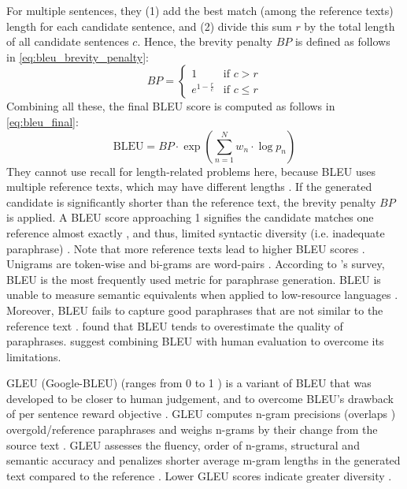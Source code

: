 For multiple sentences, they (1) add the best match (among the reference texts) length for each candidate sentence, and (2) divide this sum $r$ by the total length of all candidate sentences $c$. 
Hence, the brevity penalty $BP$ is defined as follows in \autoref{eq:bleu_brevity_penalty}:
\begin{equation}
    BP = \begin{cases}
        1 & \text{if } c > r \\
        e^{1 - \frac{r}{c}} & \text{if } c \leq r
    \end{cases}
\label{eq:bleu_brevity_penalty}
\end{equation}
Combining all these, the final BLEU score is computed as follows in \autoref{eq:bleu_final}:
\begin{equation}
    \text{BLEU} = BP \cdot \exp\left(\sum_{n=1}^{N} w_n \cdot \log p_n\right)
\label{eq:bleu_final}
\end{equation}
They cannot use recall for length-related problems here, because BLEU uses multiple reference texts, which may have different lengths \citep{papineni_bleu_2001,banerjee_METEOR_2005}.
If the generated candidate is significantly shorter than the reference text, the brevity penalty $BP$ is applied.
A BLEU score approaching 1 signifies the candidate matches one reference almost exactly \citep{papineni_bleu_2001}, 
and thus, limited syntactic diversity (i.e. inadequate paraphrase) \citep{kurt_pehlivanoglu_comparative_2024}.
Note that more reference texts lead to higher BLEU scores \citep{papineni_bleu_2001}.
Unigrams are token-wise and bi-grams are word-pairs \citet{palivela_optimization_2021}.
According to \citet{zhou_paraphrase_2021}'s survey, BLEU is the most frequently used metric for paraphrase generation.
BLEU is unable to measure semantic equivalents \citep{kurt_pehlivanoglu_comparative_2024,zhou_paraphrase_2021} 
when applied to low-resource languages \citep{zhou_paraphrase_2021}.
Moreover, BLEU fails to capture good paraphrases that are not similar to the reference text \citep{zhou_paraphrase_2021}.
\citet{kurt_pehlivanoglu_comparative_2024} found that BLEU tends to overestimate the quality of paraphrases.
\citet{zhou_paraphrase_2021} suggest combining BLEU with human evaluation to overcome its limitations.

GLEU (Google-BLEU) (ranges from 0 to 1 \citep{kurt_pehlivanoglu_comparative_2024}) is a variant of BLEU that was developed to be closer to human judgement, and to 
overcome BLEU's drawback of per sentence reward objective \citep{palivela_optimization_2021}.
GLEU computes n-gram precisions (overlaps \citep{kurt_pehlivanoglu_comparative_2024}) overgold/reference paraphrases 
and weighs n-grams by their change from the source text \citep{palivela_optimization_2021}.
GLEU assesses the fluency, order of n-grams, structural and semantic accuracy 
and penalizes shorter average m-gram lengths in the generated text compared to the reference \citep{kurt_pehlivanoglu_comparative_2024}.
Lower GLEU scores indicate greater diversity \citep{kurt_pehlivanoglu_comparative_2024}.

